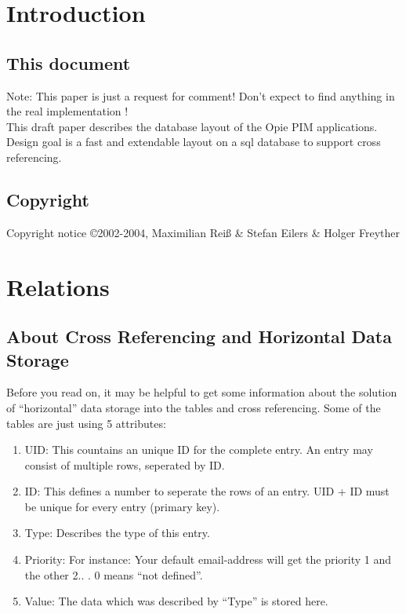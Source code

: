 \pagebreak
\section{Introduction}

\subsection{This document}

Note: This paper is just a request for comment! Don't expect to find anything in the real implementation !
\\
This draft paper describes the database layout of the Opie PIM applications.
Design goal is a fast and extendable layout on a sql database to support cross referencing.


\subsection{Copyright}

Copyright notice
\copyright 2002-2004, Maximilian Rei{\ss} \& Stefan Eilers \& Holger Freyther

\pagebreak
\section{Relations}
\subsection{About Cross Referencing and Horizontal Data Storage}
Before you read on, it may be helpful to get some information about the solution of ``horizontal'' data storage into the tables and cross referencing.
Some of the tables are just using 5 attributes:
\begin{enumerate}
\item UID: This countains an unique ID for the complete entry. An entry may consist of multiple
rows, seperated by ID.
\item ID: This defines a number to seperate the rows of an entry. UID + ID must be unique for every entry (primary key).
\item Type: Describes the type of this entry.
\item Priority: For instance: Your default email-address will get the priority 1 and the other 2.. . 0 means ``not defined''.
\item Value: The data which was described by ``Type'' is stored here.
\end{enumerate}

